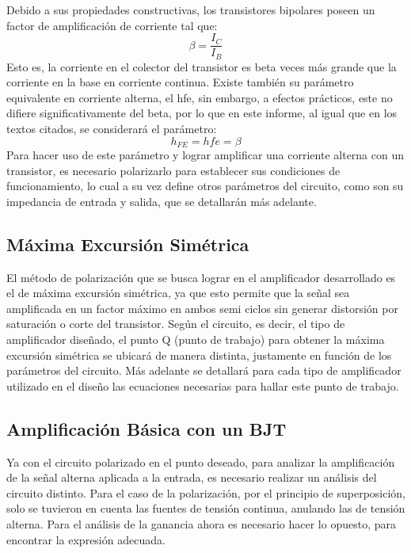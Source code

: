 Debido a sus propiedades constructivas, los transistores bipolares poseen un factor de amplificación de corriente tal que: 
\begin{equation}
    \beta = \frac{I_C}{I_B}
    \label{beta}
    \end{equation}
Esto es, la corriente en el colector del transistor es beta veces más grande que la corriente en la base en corriente continua. Existe también su parámetro equivalente en corriente alterna, el hfe, sin embargo, a efectos prácticos, este no difiere significativamente del beta, por lo que en este informe, al igual que en los textos citados, se considerará el parámetro:
\begin{equation}
    h_{FE} = hfe = \beta
    \label{hfe}
    \end{equation}
 Para hacer uso de este parámetro y lograr amplificar una corriente alterna con un transistor, es necesario polarizarlo para establecer sus condiciones de funcionamiento, lo cual a su vez define otros parámetros del circuito, como son su impedancia de entrada y salida, que se detallarán más adelante.
 
 \subsection{Máxima Excursión  Simétrica}
 
 El método de polarización que se busca lograr en el amplificador desarrollado es el de máxima excursión simétrica, ya que esto permite que la señal sea amplificada en un factor máximo en ambos semi ciclos sin generar distorsión por saturación o corte del transistor.
Según el circuito, es decir, el tipo de amplificador diseñado, el punto Q (punto de trabajo) para obtener la máxima excursión simétrica se ubicará de manera distinta, justamente en función de los parámetros del circuito. Más adelante se detallará para cada tipo de amplificador utilizado en el diseño las ecuaciones necesarias para hallar este punto de trabajo.

\subsection{Amplificación Básica con un BJT}

Ya con el circuito polarizado en el punto deseado, para analizar la amplificación de la señal alterna aplicada a la entrada, es necesario realizar un análisis del circuito distinto. Para el caso de la polarización, por el principio de superposición, solo se tuvieron en cuenta las fuentes de tensión continua, anulando las de tensión alterna. Para el análisis de la ganancia ahora es necesario hacer lo opuesto, para encontrar la expresión adecuada.

